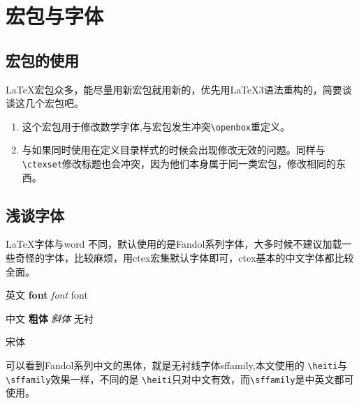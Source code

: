 \section{宏包与字体}
\subsection{宏包的使用}
\LaTeX 宏包众多，能尽量用新宏包就用新的，优先用\LaTeX 3语法重构的，简要谈谈这几个宏包吧。
\begin{enumerate}
    \item  {} 这个宏包用于修改数学字体,与宏包发生冲突\verb|\openbox|重定义。
    \item  {}与如果同时使用在定义目录样式的时候会出现修改无效的问题。同样与\verb|\ctexset|修改标题也会冲突，因为他们本身属于同一类宏包，修改相同的东西。
\end{enumerate}

\subsection{浅谈字体}
\LaTeX 字体与word 不同，默认使用的是Fandol系列字体，大多时候不建议加载一些奇怪的字体，比较麻烦，用ctex宏集默认字体即可，ctex基本的中文字体都比较全面。

\begin{center}
\Large   
英文  \qquad  \LARGE \textbf{font}  \huge \qquad  \textit{font}  \qquad \Huge \textsf{font}
  
 
\Large 中文   \qquad   \LARGE  \textbf{粗体}  \qquad \huge  \textit{斜体}  \qquad \Huge \textsf{无衬}

{\Large  \songti 宋体}
\end{center}

可以看到Fandol系列中文的黑体，就是无衬线字体sffamily,本文使用的
\verb|\heiti|与\verb|\sffamily|效果一样，不同的是
\verb|\heiti|只对中文有效，而\verb|\sffamily|是中英文都可使用。
\newpage 